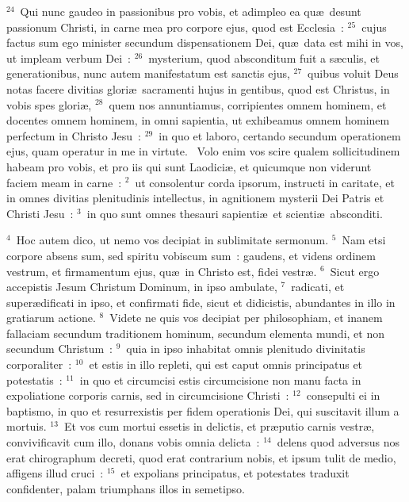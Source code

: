 ${}^{24}$~Qui nunc gaudeo in passionibus pro vobis, et adimpleo ea qu\ae\ desunt passionum Christi, in carne mea pro corpore ejus, quod est Ecclesia~:
${}^{25}$~cujus factus sum ego minister secundum dispensationem Dei, qu\ae\ data est mihi in vos, ut impleam verbum Dei~:
${}^{26}$~mysterium, quod absconditum fuit a s\ae culis, et generationibus, nunc autem manifestatum est sanctis ejus,
${}^{27}$~quibus voluit Deus notas facere divitias glori\ae\ sacramenti hujus in gentibus, quod est Christus, in vobis spes glori\ae ,
${}^{28}$~quem nos annuntiamus, corripientes omnem hominem, et docentes omnem hominem, in omni sapientia, ut exhibeamus omnem hominem perfectum in Christo Jesu~:
${}^{29}$~in quo et laboro, certando secundum operationem ejus, quam operatur in me in virtute.
~\lettrine[lines=10,image=true,loversize=0.05,lraise=-0.03]{V}{}olo enim vos scire qualem sollicitudinem habeam pro vobis, et pro iis qui sunt Laodici\ae , et quicumque non viderunt faciem meam in carne~:
${}^{2}$~ut consolentur corda ipsorum, instructi in caritate, et in omnes divitias plenitudinis intellectus, in agnitionem mysterii Dei Patris et Christi Jesu~:
${}^{3}$~in quo sunt omnes thesauri sapienti\ae\ et scienti\ae\ absconditi.


${}^{4}$~Hoc autem dico, ut nemo vos decipiat in sublimitate sermonum.
${}^{5}$~Nam etsi corpore absens sum, sed spiritu vobiscum sum~: gaudens, et videns ordinem vestrum, et firmamentum ejus, qu\ae\ in Christo est, fidei vestr\ae .
${}^{6}$~Sicut ergo accepistis Jesum Christum Dominum, in ipso ambulate,
${}^{7}$~radicati, et super\ae dificati in ipso, et confirmati fide, sicut et didicistis, abundantes in illo in gratiarum actione.
${}^{8}$~Videte ne quis vos decipiat per philosophiam, et inanem fallaciam secundum traditionem hominum, secundum elementa mundi, et non secundum Christum~:
${}^{9}$~quia in ipso inhabitat omnis plenitudo divinitatis corporaliter~:
${}^{10}$~et estis in illo repleti, qui est caput omnis principatus et potestatis~:
${}^{11}$~in quo et circumcisi estis circumcisione non manu facta in expoliatione corporis carnis, sed in circumcisione Christi~:
${}^{12}$~consepulti ei in baptismo, in quo et resurrexistis per fidem operationis Dei, qui suscitavit illum a mortuis.
${}^{13}$~Et vos cum mortui essetis in delictis, et pr\ae putio carnis vestr\ae , convivificavit cum illo, donans vobis omnia delicta~:
${}^{14}$~delens quod adversus nos erat chirographum decreti, quod erat contrarium nobis, et ipsum tulit de medio, affigens illud cruci~:
${}^{15}$~et expolians principatus, et potestates traduxit confidenter, palam triumphans illos in semetipso.


